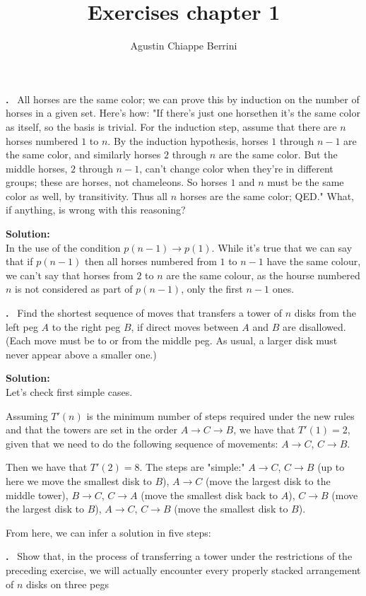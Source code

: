 \documentclass{article}
\author{Agustin Chiappe Berrini}
\title{Exercises chapter 1}
\newcounter{problem}
\newcommand\Problem{%
 \stepcounter{problem}%
 \textbf{\theproblem.}~%
}
\newcommand\TheSolution{%
 \textbf{Solution:}\\%
}
\begin{document}
 \maketitle
 \newpage

 \Problem All horses are the same color; we can prove this by induction on the number of horses in a given set. Here's how: "If there's just one horsethen it's the same color as itself, so the basis is trivial. For the induction step, assume that there are $n$ horses numbered $1$ to $n$. By the induction hypothesis, horses $1$ through $n-1$ are the same color, and similarly horses $2$ through $n$ are the same color. But the middle horses, $2$ through $n-1$, can't change color when they're in different groups; these are horses, not chameleons. So horses $1$ and $n$ must be the same color as well, by transitivity. Thus all $n$ horses are the same color; QED." What, if anything, is wrong with this reasoning?

 \TheSolution In the use of the condition $p(n-1) \to p(1)$. While it's true that we can say that if $p(n-1)$ then all horses numbered from $1$ to $n-1$ have the same colour, we can't say that horses from $2$ to $n$ are the same colour, as the hourse numbered $n$ is not considered as part of $p(n-1)$, only the first $n-1$ ones.

 \Problem Find the shortest sequence of moves that transfers a tower of $n$ disks from the left peg $A$ to the right peg $B$, if direct moves between $A$ and $B$ are disallowed. (Each move must be to or from the middle peg. As usual, a larger disk must never appear above a smaller one.)

 \TheSolution Let's check first simple cases.

 Assuming $T'(n)$ is the minimum number of steps required under the new rules and that the towers are set in the order $A \to C \to B$, we have that $T'(1) = 2$, given that we need to do the following sequence of movements: $A \to C$, $C \to B$.

 Then we have that $T'(2) = 8$. The steps are "simple:" $A \to C$, $C \to B$ (up to here we move the smallest disk to $B$), $A \to C$ (move the largest disk to the middle tower), $B \to C$, $C \to A$ (move the smallest disk back to $A$), $C \to B$ (move the largest disk to $B$), $A \to C$, $C \to B$ (move the smallest disk to $B$).

 From here, we can infer a solution in five steps:

 \Problem Show that, in the process of transferring a tower under the restrictions of the preceding exercise, we will actually encounter every properly stacked arrangement of $n$ disks on three pegs
\end{document}
